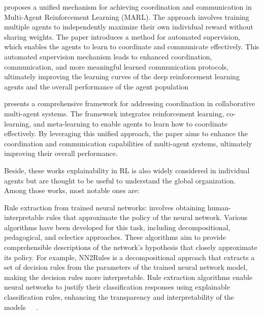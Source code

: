 \documentclass[runningheads]{llncs}
\begin{document}
\cite{Chongjie2008} proposes a unified mechanism for achieving coordination and communication in Multi-Agent Reinforcement Learning (MARL). The approach involves training multiple agents to independently maximize their own individual reward without sharing weights. The paper introduces a method for automated supervision, which enables the agents to learn to coordinate and communicate effectively. This automated supervision mechanism leads to enhanced coordination, communication, and more meaningful learned communication protocols, ultimately improving the learning curves of the deep reinforcement learning agents and the overall performance of the agent population

\cite{Tosic2010} presents a comprehensive framework for addressing coordination in collaborative multi-agent systems. The framework integrates reinforcement learning, co-learning, and meta-learning to enable agents to learn how to coordinate effectively. By leveraging this unified approach, the paper aims to enhance the coordination and communication capabilities of multi-agent systems, ultimately improving their overall performance. 

Beside, these works explainability in RL is also widely considered in individual agents but are thought to be useful to understand the global organization. Among those works, most notable ones are:

Rule extraction from trained neural networks: involves obtaining human-interpretable rules that approximate the policy of the neural network. Various algorithms have been developed for this task, including decompositional, pedagogical, and eclectics approaches. These algorithms aim to provide comprehensible descriptions of the network's hypothesis that closely approximate its policy. For example, NN2Rules is a decompositional approach that extracts a set of decision rules from the parameters of the trained neural network model, making the decision rules more interpretable. Rule extraction algorithms enable neural networks to justify their classification responses using explainable classification rules, enhancing the transparency and interpretability of the models~\cite{Hailesilassie2016}~\cite{Sato2001}~\cite{Lal2022}.
\end{document}
